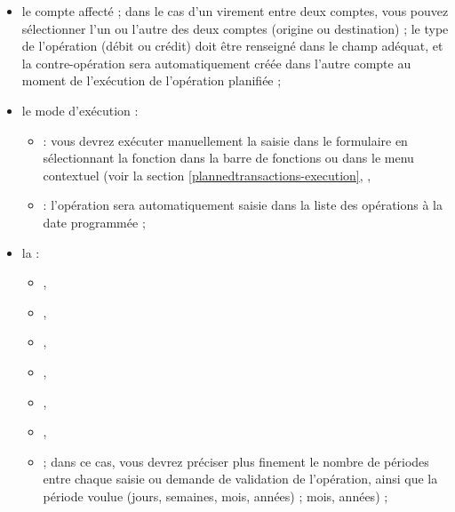 \begin{itemize}
	\item le compte affecté ; dans le cas d'un virement entre deux comptes, vous pouvez sélectionner l'un ou l'autre des deux comptes (origine ou destination) ; le type de l'opération (débit ou crédit) doit être renseigné dans le champ adéquat, et la contre-opération sera automatiquement créée dans l'autre compte au moment de l'exécution de l'opération planifiée ;
	
	\item le mode d'exécution :
	
		\begin{itemize}
			\item {} : vous devrez exécuter manuellement la saisie dans le formulaire en sélectionnant la fonction  dans la barre de fonctions ou dans le menu contextuel (voir la section \vref{plannedtransactions-execution}, ,
			\item {} : l'opération sera automatiquement saisie dans la liste des opérations à la date programmée ;
		\end{itemize}
	
	\item la  :
		\begin{itemize}
			\item {},
			\item {},
			\item {},
			\item {},
			\item {},
			\item {},
			\item {} ; dans ce cas, vous devrez préciser plus finement le nombre de périodes entre chaque saisie ou demande de validation de l'opération, ainsi que la période voulue (jours, semaines, \ifIllustration mois, années) ;
	\else mois, années) ;
	\fi
	

\end{itemize}
\end{itemize}
